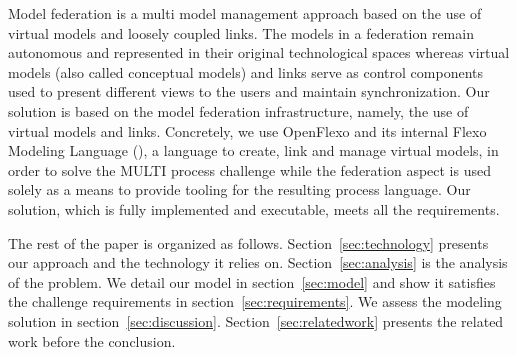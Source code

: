 Model federation is a multi model management approach based on the use of virtual models and loosely coupled links. The models in a federation remain autonomous and represented in their original technological spaces whereas virtual models (also called conceptual models) and links serve as control components used to present different views to the users and maintain synchronization. 
Our solution is based on the model federation infrastructure, namely, the use of virtual models and links. Concretely, we use OpenFlexo and its internal Flexo Modeling Language (\FML), a language to create, link and manage virtual models, in order to solve the MULTI process challenge while the federation aspect is used solely as a means to provide tooling for the resulting process language. Our solution, which is fully implemented and executable, meets all the requirements. 


The rest of the paper is organized as follows. Section~\ref{sec:technology} presents our approach and the technology it relies on. Section~\ref{sec:analysis} is the analysis of the problem. We detail our model in section~\ref{sec:model} and show it satisfies the challenge requirements in section~\ref{sec:requirements}. We assess the modeling solution in section~\ref{sec:discussion}. Section~\ref{sec:relatedwork} presents the related work before the conclusion.%





